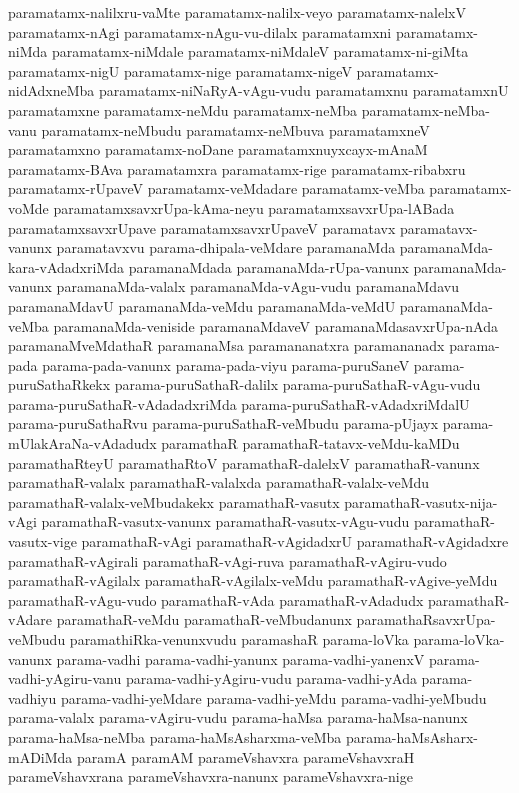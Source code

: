 {paramatamx-nalilxru-vaMte
paramatamx-nalilx-veyo
paramatamx-nalelxV
paramatamx-nAgi
paramatamx-nAgu-vu-dilalx
paramatamxni
paramatamx-niMda
paramatamx-niMdale
paramatamx-niMdaleV
paramatamx-ni-giMta
paramatamx-nigU
paramatamx-nige
paramatamx-nigeV
paramatamx-nidAdxneMba
paramatamx-niNaRyA-vAgu-vudu
paramatamxnu
paramatamxnU
paramatamxne
paramatamx-neMdu
paramatamx-neMba
paramatamx-neMba-vanu
paramatamx-neMbudu
paramatamx-neMbuva
paramatamxneV
paramatamxno
paramatamx-noDane
paramatamxnuyxcayx-mAnaM
paramatamx-BAva
paramatamxra
paramatamx-rige
paramatamx-ribabxru
paramatamx-rUpaveV
paramatamx-veMdadare
paramatamx-veMba
paramatamx-voMde
paramatamxsavxrUpa-kAma-neyu
paramatamxsavxrUpa-lABada
paramatamxsavxrUpave
paramatamxsavxrUpaveV
paramatavx
paramatavx-vanunx
paramatavxvu
parama-dhipala-veMdare
paramanaMda
paramanaMda-kara-vAdadxriMda
paramanaMdada
paramanaMda-rUpa-vanunx
paramanaMda-vanunx
paramanaMda-valalx
paramanaMda-vAgu-vudu
paramanaMdavu
paramanaMdavU
paramanaMda-veMdu
paramanaMda-veMdU
paramanaMda-veMba
paramanaMda-veniside
paramanaMdaveV
paramanaMdasavxrUpa-nAda
paramanaMveMdathaR
paramanaMsa
paramananatxra
paramananadx
parama-pada
parama-pada-vanunx
parama-pada-viyu
parama-puruSaneV
parama-puruSathaRkekx
parama-puruSathaR-dalilx
parama-puruSathaR-vAgu-vudu
parama-puruSathaR-vAdadadxriMda
parama-puruSathaR-vAdadxriMdalU
parama-puruSathaRvu
parama-puruSathaR-veMbudu
parama-pUjayx
parama-mUlakAraNa-vAdadudx
paramathaR
paramathaR-tatavx-veMdu-kaMDu
paramathaRteyU
paramathaRtoV
paramathaR-dalelxV
paramathaR-vanunx
paramathaR-valalx
paramathaR-valalxda
paramathaR-valalx-veMdu
paramathaR-valalx-veMbudakekx
paramathaR-vasutx
paramathaR-vasutx-nija-vAgi
paramathaR-vasutx-vanunx
paramathaR-vasutx-vAgu-vudu
paramathaR-vasutx-vige
paramathaR-vAgi
paramathaR-vAgidadxrU
paramathaR-vAgidadxre
paramathaR-vAgirali
paramathaR-vAgi-ruva
paramathaR-vAgiru-vudo
paramathaR-vAgilalx
paramathaR-vAgilalx-veMdu
paramathaR-vAgive-yeMdu
paramathaR-vAgu-vudo
paramathaR-vAda
paramathaR-vAdadudx
paramathaR-vAdare
paramathaR-veMdu
paramathaR-veMbudanunx
paramathaRsavxrUpa-veMbudu
paramathiRka-venunxvudu
paramashaR
parama-loVka
parama-loVka-vanunx
parama-vadhi
parama-vadhi-yanunx
parama-vadhi-yanenxV
parama-vadhi-yAgiru-vanu
parama-vadhi-yAgiru-vudu
parama-vadhi-yAda
parama-vadhiyu
parama-vadhi-yeMdare
parama-vadhi-yeMdu
parama-vadhi-yeMbudu
parama-valalx
parama-vAgiru-vudu
parama-haMsa
parama-haMsa-nanunx
parama-haMsa-neMba
parama-haMsAsharxma-veMba
parama-haMsAsharx-mADiMda
paramA
paramAM
parameVshavxra
parameVshavxraH
parameVshavxrana
parameVshavxra-nanunx
parameVshavxra-nige
}
